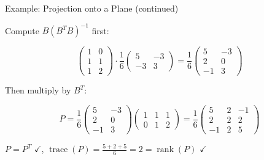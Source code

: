 \documentclass[10pt]{beamer}
\theoremstyle{definition}
\begin{document}
\begin{frame}{Example: Projection onto a Plane (continued)}

Compute $B(B^TB)^{-1}$ first:

$$\begin{pmatrix} 1 & 0 \\ 1 & 1 \\ 1 & 2 \end{pmatrix} \cdot \frac{1}{6}\begin{pmatrix} 5 & -3 \\ -3 & 3 \end{pmatrix} = \frac{1}{6}\begin{pmatrix} 5 & -3 \\ 2 & 0 \\ -1 & 3 \end{pmatrix}$$

\vspace{0.3em}

Then multiply by $B^T$:

$$P = \frac{1}{6}\begin{pmatrix} 5 & -3 \\ 2 & 0 \\ -1 & 3 \end{pmatrix}\begin{pmatrix} 1 & 1 & 1 \\ 0 & 1 & 2 \end{pmatrix} = \frac{1}{6}\begin{pmatrix} 5 & 2 & -1 \\ 2 & 2 & 2 \\ -1 & 2 & 5 \end{pmatrix}$$

\vspace{0.3em}

$P = P^T$ $\checkmark$, \quad $\operatorname{trace}(P) = \frac{5+2+5}{6} = 2 = \operatorname{rank}(P)$ $\checkmark$

\end{frame}


\end{document}
